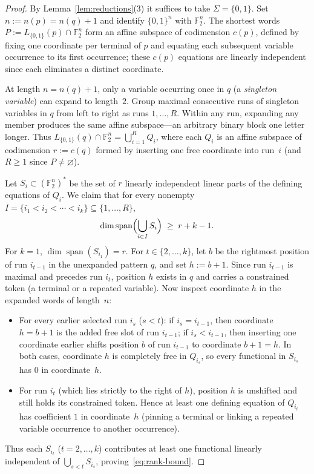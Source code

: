 \documentclass[11pt]{article}
\theoremstyle{plain}
\theoremstyle{definition}
\theoremstyle{remark}
\DeclareMathOperator{\spn}{span}
\begin{document}
\begin{proof}
By Lemma~\ref{lem:reductions}(3) it suffices to take $\Sigma = \{0,1\}$.
Set $n := n(p) = n(q) + 1$ and identify $\{0,1\}^n$ with $\mathbb{F}_2^n$.
The shortest words $P := L_{\{0,1\}}(p) \cap \mathbb{F}_2^n$ form an affine subspace of codimension $c(p)$, defined by fixing one coordinate per terminal of $p$ and equating each subsequent variable occurrence to its first occurrence; these $c(p)$ equations are linearly independent since each eliminates a distinct coordinate.

At length $n = n(q) + 1$, only a variable occurring once in $q$ (a \emph{singleton variable}) can expand to length~$2$.
Group maximal consecutive runs of singleton variables in $q$ from left to right as runs $1, \dots, R$.
Within any run, expanding any member produces the same affine subspace—an arbitrary binary block one letter longer.
Thus $L_{\{0,1\}}(q) \cap \mathbb{F}_2^n = \bigcup_{i=1}^R Q_i$, where each $Q_i$ is an affine subspace of codimension $r := c(q)$ formed by inserting one free coordinate into run~$i$ (and $R \ge 1$ since $P \neq \varnothing$).

Let $S_i \subset (\mathbb{F}_2^n)^*$ be the set of $r$ linearly independent linear parts of the defining equations of $Q_i$.
We claim that for every nonempty $I = \{i_1 < i_2 < \cdots < i_k\} \subseteq \{1, \dots, R\}$,
\begin{equation}\label{eq:rank-bound}
\dim\spn\Bigl(\bigcup_{i \in I} S_i\Bigr) \;\ge\; r + k - 1.
\end{equation}
For $k = 1$, $\dim\spn(S_{i_1}) = r$.
For $t \in \{2, \dots, k\}$, let $b$ be the rightmost position of run $i_{t-1}$ in the unexpanded pattern $q$, and set $h := b + 1$.
Since run $i_{t-1}$ is maximal and precedes run $i_t$, position $h$ exists in $q$ and carries a constrained token (a terminal or a repeated variable).
Now inspect coordinate $h$ in the expanded words of length~$n$:
\begin{itemize}[leftmargin=1.6em,itemsep=2pt]
\item For every earlier selected run $i_s$ ($s < t$): if $i_s = i_{t-1}$, then coordinate $h = b + 1$ is the added free slot of run $i_{t-1}$; if $i_s < i_{t-1}$, then inserting one coordinate earlier shifts position $b$ of run $i_{t-1}$ to coordinate $b + 1 = h$. In both cases, coordinate $h$ is completely free in $Q_{i_s}$, so every functional in $S_{i_s}$ has $0$ in coordinate~$h$.
\item For run $i_t$ (which lies strictly to the right of $h$), position $h$ is unshifted and still holds its constrained token. Hence at least one defining equation of $Q_{i_t}$ has coefficient $1$ in coordinate~$h$ (pinning a terminal or linking a repeated variable occurrence to another occurrence).
\end{itemize}
Thus each $S_{i_t}$ ($t = 2, \dots, k$) contributes at least one functional linearly independent of $\bigcup_{s < t} S_{i_s}$, proving~\eqref{eq:rank-bound}.


\end{proof}
\end{document}
